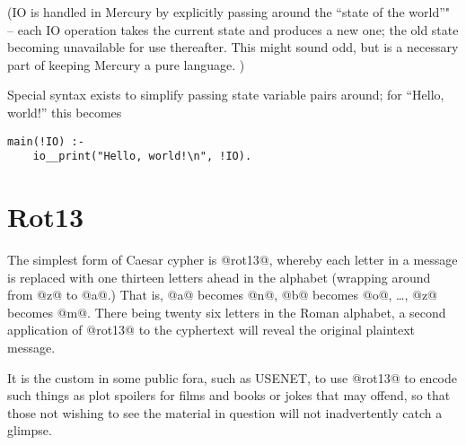 (IO is handled in Mercury by explicitly passing around the ``state
of the world''" -- each IO operation takes the current state and
produces a new one; the old state becoming unavailable for use
thereafter.  This might sound odd, but is a necessary part of
keeping Mercury a pure language.  )

Special syntax exists to simplify passing state variable pairs
around; for ``Hello, world!'' this becomes
\begin{verbatim}
main(!IO) :-
    io__print("Hello, world!\n", !IO).
\end{verbatim}



\section{Rot13}

The simplest form of Caesar cypher is @rot13@, whereby each letter in a
message is replaced with one thirteen letters ahead in the alphabet
(wrapping around from @z@ to @a@.) That is, @a@ becomes @n@, @b@ becomes
@o@, \ldots, @z@ becomes @m@.  There being twenty six letters in the
Roman alphabet, a second application of @rot13@ to the cyphertext will
reveal the original plaintext message.

It is the custom in some public fora, such as USENET, to use @rot13@ to
encode such things as plot spoilers for films and books or jokes that
may offend, so that those not wishing to see the material in question
will not inadvertently catch a glimpse.

